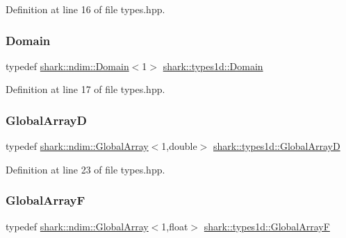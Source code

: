 Definition at line 16 of file types.\+hpp.

\hypertarget{namespaceshark_1_1types1d_a1c8bb3eeae3e12c881ef141e0458cb6e}{}\label{namespaceshark_1_1types1d_a1c8bb3eeae3e12c881ef141e0458cb6e} 
\subsubsection{\texorpdfstring{Domain}{Domain}}
{\footnotesize\ttfamily typedef \hyperlink{classshark_1_1ndim_1_1_domain}{shark\+::ndim\+::\+Domain}$<$1$>$ \hyperlink{namespaceshark_1_1types1d_a1c8bb3eeae3e12c881ef141e0458cb6e}{shark\+::types1d\+::\+Domain}}



Definition at line 17 of file types.\+hpp.

\hypertarget{namespaceshark_1_1types1d_af0b4fbd404532626bd95fff52b0be385}{}\label{namespaceshark_1_1types1d_af0b4fbd404532626bd95fff52b0be385} 
\subsubsection{\texorpdfstring{Global\+ArrayD}{GlobalArrayD}}
{\footnotesize\ttfamily typedef \hyperlink{classshark_1_1ndim_1_1_global_array}{shark\+::ndim\+::\+Global\+Array}$<$1,double$>$ \hyperlink{namespaceshark_1_1types1d_af0b4fbd404532626bd95fff52b0be385}{shark\+::types1d\+::\+Global\+ArrayD}}



Definition at line 23 of file types.\+hpp.

\hypertarget{namespaceshark_1_1types1d_a25c5c8fb6e2c34b710bfcb578f61b8ac}{}\label{namespaceshark_1_1types1d_a25c5c8fb6e2c34b710bfcb578f61b8ac} 
\subsubsection{\texorpdfstring{Global\+ArrayF}{GlobalArrayF}}
{\footnotesize\ttfamily typedef \hyperlink{classshark_1_1ndim_1_1_global_array}{shark\+::ndim\+::\+Global\+Array}$<$1,float$>$ \hyperlink{namespaceshark_1_1types1d_a25c5c8fb6e2c34b710bfcb578f61b8ac}{shark\+::types1d\+::\+Global\+ArrayF}}



